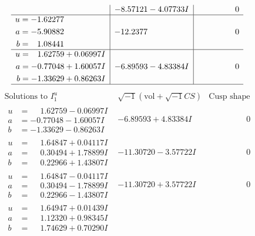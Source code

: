 \documentclass[1p]{elsarticle_modified}
\theoremstyle{definition}
\newcommand{\I}{\sqrt{-1}}
\begin{document}
$$\begin{array}{c|c|c}
 & -8.57121 - 4.07733 I & \phantom{-0.000000 } 0 \\ \hline\begin{aligned}
u &= -1.62277\phantom{ +0.000000I} \\
a &= -5.90882\phantom{ +0.000000I} \\
b &= \phantom{-}1.08441\phantom{ +0.000000I}\end{aligned}
 & -12.2377\phantom{ +0.000000I} & \phantom{-0.000000 } 0 \\ \hline\begin{aligned}
u &= \phantom{-}1.62759 + 0.06997 I \\
a &= -0.77048 + 1.60057 I \\
b &= -1.33629 + 0.86263 I\end{aligned}
 & -6.89593 - 4.83384 I & \phantom{-0.000000 } 0\\
 \hline 
 \end{array}$$\newpage$$\begin{array}{c|c|c}  
\text{Solutions to }I^u_{1}& \I (\text{vol} + \sqrt{-1}CS) & \text{Cusp shape}\\
 \hline 
\begin{aligned}
u &= \phantom{-}1.62759 - 0.06997 I \\
a &= -0.77048 - 1.60057 I \\
b &= -1.33629 - 0.86263 I\end{aligned}
 & -6.89593 + 4.83384 I & \phantom{-0.000000 } 0 \\ \hline\begin{aligned}
u &= \phantom{-}1.64847 + 0.04117 I \\
a &= \phantom{-}0.30494 + 1.78899 I \\
b &= \phantom{-}0.22966 + 1.43807 I\end{aligned}
 & -11.30720 - 3.57722 I & \phantom{-0.000000 } 0 \\ \hline\begin{aligned}
u &= \phantom{-}1.64847 - 0.04117 I \\
a &= \phantom{-}0.30494 - 1.78899 I \\
b &= \phantom{-}0.22966 - 1.43807 I\end{aligned}
 & -11.30720 + 3.57722 I & \phantom{-0.000000 } 0 \\ \hline\begin{aligned}
u &= \phantom{-}1.64947 + 0.01439 I \\
a &= \phantom{-}1.12320 + 0.98345 I \\
b &= \phantom{-}1.74629 + 0.70290 I\end{aligned}

\end{array}$$
\end{document}
